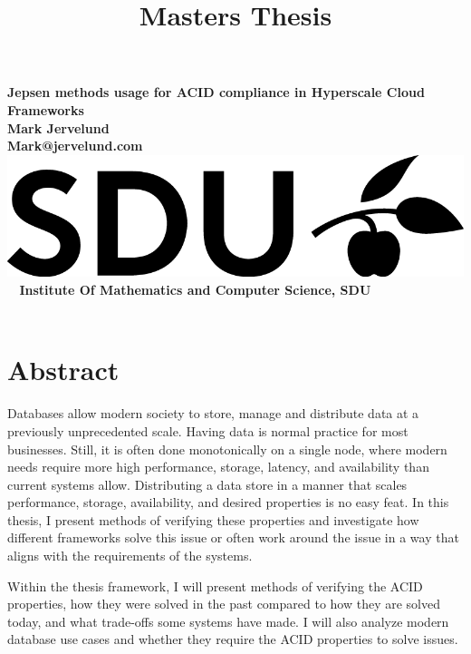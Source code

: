 \documentclass[a4paper,10pt,titlepage]{report}
\date{}
\title{Masters Thesis}
\begin{document}
\begin{titlepage}
\centering
    \vspace*{9\baselineskip}
    \huge
    \bfseries
    Jepsen methods usage for ACID compliance in Hyperscale Cloud Frameworks \\
    \normalfont
    Mark Jervelund \\
    Mark@jervelund.com \\
    \vspace*{9\baselineskip}
    \normalfont
	\includegraphics[scale=1]{logos/SDU_BLACK.png}
    \vfill\
    \vspace{5mm}
    Institute Of Mathematics and Computer Science, SDU \\

    \textbf{\datedate} \\[2\baselineskip]
\end{titlepage}

\renewcommand{\thepage}{\roman{page}}%
\tableofcontents
\newpage
\setcounter{page}{1}
\renewcommand{\thepage}{\arabic{page}}


\section*{Abstract}

Databases allow modern society to store, manage and distribute data at a previously unprecedented scale. Having data is normal practice for most businesses. Still, it is often done monotonically on a single node, where modern needs require more high performance, storage, latency, and availability than current systems allow. Distributing a data store in a manner that scales performance, storage, availability, and desired properties is no easy feat. In this thesis, I present methods of verifying these properties and investigate how different frameworks solve this issue or often work around the issue in a way that aligns with the requirements of the systems. \\
\vspace{5mm}

Within the thesis framework, I will present methods of verifying the ACID properties, how they were solved in the past compared to how they are solved today, and what trade-offs some systems have made. I will also analyze modern database use cases and whether they require the ACID properties to solve issues.\\
\vspace{5mm}
\end{document}
